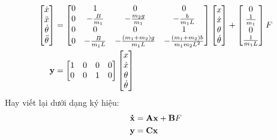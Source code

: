 \documentclass[12pt,a4paper]{article}
\begin{document}
\begin{align}
    \begin{bmatrix}
        \dot x \\ \ddot x \\ \dot \theta \\ \ddot\theta 
    \end{bmatrix} & = \begin{bmatrix}
        0 & 1 & 0 & 0 \\
        0 & -\frac{B}{m_1} & -\frac{m_2g}{m_1} & -\frac{b}{m_1L}\\
        0 & 0 & 0 & 1 \\
        0 & -\frac{B}{m_1L} & -\frac{(m_1+m_2)g}{m_1L} & -\frac{(m_1+m_2)b}{m_1m_2L^2}
    \end{bmatrix}\begin{bmatrix}
        x \\ \dot x \\ \theta \\ \dot\theta 
    \end{bmatrix} + \begin{bmatrix}
        0 \\ \frac{1}{m_1} \\ 0 \\ \frac{1}{m_1L}
    \end{bmatrix}F\label{eqn:11}\\
    \vb y & = \begin{bmatrix}
        1 & 0 & 0 & 0\\
        0 & 0 & 1 & 0
    \end{bmatrix}\begin{bmatrix}
        x \\ \dot x \\ \theta \\ \dot\theta 
    \end{bmatrix}\label{eqn:12}
\end{align}
Hay viết lại dưới dạng ký hiệu:
\begin{align}
    \vb{\dot x} &= \vb{Ax} + \vb{B}F \label{eqn:13}\\
    \vb y &= \vb{Cx} \label{eqn:14}
\end{align}

\newpage
\end{document}
